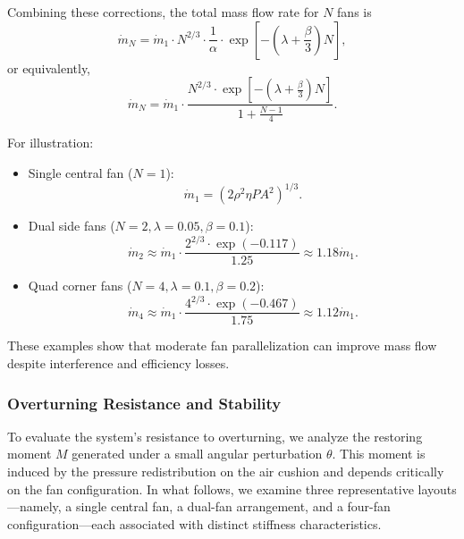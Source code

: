 Combining these corrections, the total mass flow rate for \( N \) fans is
\begin{equation}
    \dot{m}_N = \dot{m}_1 \cdot N^{2/3} \cdot \frac{1}{\alpha} \cdot \exp\left[-(\lambda + \frac{\beta}{3})N \right],
\end{equation}
or equivalently,
\begin{equation}
    \dot{m}_N = \dot{m}_1 \cdot \frac{N^{2/3} \cdot \exp\left[-(\lambda + \frac{\beta}{3})N \right]}{1 + \frac{N - 1}{4}}.
\end{equation}

For illustration:

\begin{itemize}
  \item Single central fan (\( N=1 \)):
  \begin{equation}
      \dot{m}_1 = \left( 2 \rho^2 \eta P A^2 \right)^{1/3}.
  \end{equation}
  \item Dual side fans (\( N=2, \lambda=0.05, \beta=0.1 \)):
  \begin{equation}
      \dot{m}_2 \approx \dot{m}_1 \cdot \frac{2^{2/3} \cdot \exp(-0.117)}{1.25} \approx 1.18 \dot{m}_1.
  \end{equation}
  \item Quad corner fans (\( N=4, \lambda=0.1, \beta=0.2 \)):
  \begin{equation}
      \dot{m}_4 \approx \dot{m}_1 \cdot \frac{4^{2/3} \cdot \exp(-0.467)}{1.75} \approx 1.12 \dot{m}_1.
  \end{equation}
\end{itemize}

These examples show that moderate fan parallelization can improve mass flow despite interference and efficiency losses.

\subsubsection{Overturning Resistance and Stability}

To evaluate the system's resistance to overturning, we analyze the restoring moment \( M \) generated under a small angular perturbation \( \theta \). This moment is induced by the pressure redistribution on the air cushion and depends critically on the fan configuration. In what follows, we examine three representative layouts—namely, a single central fan, a dual-fan arrangement, and a four-fan configuration—each associated with distinct stiffness characteristics.

